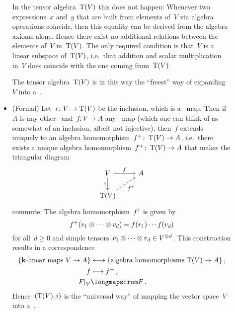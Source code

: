 \begin{recall}
\begin{description}
\begin{itemize}
          In the tensor algebra~$\operatorname{T}(V)$ this does not happen:
          Whenever two expressions~$x$ and~$y$ that are built from elements of~$V$ via algebra operations coincide, then this equality can be derived from the algebra axioms alone.
          Hence there exist no additional relations between the elements of~$V$ in~$\operatorname{T}(V)$.
          The only required condition is that~$V$ is a linear subspace of~$\operatorname{T}(V)$, i.e.\ that addition and scalar multiplication in~$V$ does coincide with the one coming from~$\operatorname{T}(V)$.
          
          The tensor algebra~$\operatorname{T}(V)$ is in this way the \enquote{freest} way of expanding~$V$ into a~{\algebra{$\kf$}}.
        \item(Formal)
          Let~$\iota \colon V \to \operatorname{T}(V)$ be the inclusion, which is a~{\linear{$\kf$}} map.
          Then if~$A$ is any other~{\algebra{$\kf$}} and~$f \colon V \to A$ any~{\linear{$\kf$}} map (which one can think of as somewhat of an inclusion, albeit not injective), then~$f$ extends uniquely to an algebra homomorphism~$f^+ \colon \operatorname{T}(V) \to A$, i.e.\ there exists a unique algebra homomorphism~$f^+ \colon \operatorname{T}(V) \to A$ that makes the triangular diagram
          \[
            \begin{tikzcd}
              V
              \arrow{r}[above]{f}
              \arrow{d}[left]{i}
              &
              A
              \\
              \Tensor(V)
              \arrow[dashed]{ur}[below right]{f^+}
              &
              {}
            \end{tikzcd}
          \]
          commute.
          The algebra homomorphism~$f^+$ is given by
          \[
            f^+(v_1 \otimes \dotsb \otimes v_d)
            =
            f(v_1) \dotsm f(v_d)
          \]
          for all~$d \geq 0$ and simple tensors~$v_1 \otimes \dotsb \otimes v_d \in V^{\otimes d}$.
          This construction results in a {\onetoone} correspondence
          \begin{align*}
            \{ \text{\linear{$\kf$} maps~$V \to A$} \}
            &\longonetoone
            \{ \text{algebra homomorphisms~$\Tensor(V) \to A$} \} \,,
            \\
            f
            &\longmapsto
            f^+ \,,
            \\
            \restrict{F}{V}
            &\longmapsfrom
            F \,.
          \end{align*}
          Hence~$(\operatorname{T}(V), i)$ is the \enquote{universal way} of mapping the vector space~$V$ into a~{\algebra{$\kf$}}.
          

\end{itemize}
\end{description}
\end{recall}
